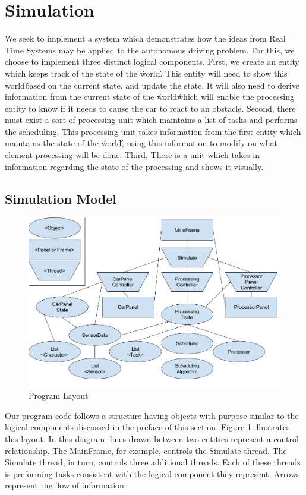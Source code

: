 \documentclass{article} %
\begin{document}
\section{Simulation}
We seek to implement a system which demonstrates how the ideas from Real Time Systems may be applied to the autonomous driving problem.
For this, we choose to implement three distinct logical components.
First, we create an entity which keeps track of the state of the \'world\'. This entity will need to show this \'world\' based on the current state, and update the state. It will also need to derive information from the current state of the \'world\' which will enable the processing entity to know if it needs to cause the car to react to an obstacle.
Second, there must exist a sort of processing unit which maintains a list of tasks and performs the scheduling. This processing unit takes information from the first entity which maintains the state of the \'world\', using this information to modify on what element  processing will be done.
Third, There is a unit which takes in information regarding the state of the processing and shows it visually.

\subsection{Simulation Model}
\begin{figure}[!hbt]
\begin{center}
\includegraphics[width=.4\textwidth,keepaspectratio]{code_layout.png}
\end{center}
\caption{Program Layout}
\label{FIG-DIAGRAM}
\end{figure}

Our program code follows a structure having objects with purpose similar to the logical components discussed in the preface of this section.
Figure \ref{FIG-DIAGRAM} illustrates this layout.
In this diagram, lines drawn between two entities represent a control relationship. The MainFrame, for example, controls the Simulate thread.
The Simulate thread, in turn, controls three additional threads. Each of these threads is preforming tasks consistent with the logical component they represent.
Arrows represent the flow of information.
\end{document}
